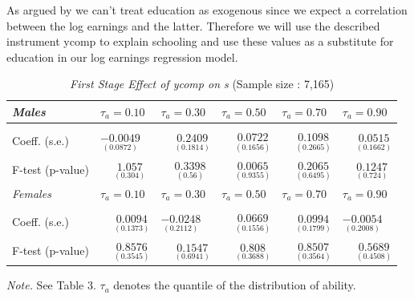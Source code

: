 \documentclass[12pt,a4paper]{article}
\begin{document}
As argued by \textcite{brunello} we can't treat education as exogenous
since we expect a correlation between the log earnings and the latter.
Therefore we will use the described instrument ycomp to explain
schooling and use these values as a substitute for education in our log
earnings regression model.


\begin{table}[!htbp]
\captionsetup{justification=centering}
  \begin{threeparttable}
       \caption{\textit{First Stage Effect of ycomp on s} (Sample size : 7,165)}
        \begin{tabular}{*{6}{l}}
        \toprule 
        \textit{Males}  & \( \tau_a=0.10 \) & \( \tau_a= 0.30 \) & \( \tau_a= 0.50 \) & \( \tau_a= 0.70 \) & \( \tau_a= 0.90 \) \\
        \midrule     \\
        Coeff. (s.e.)   & $\underset{(0.0872)}{-0.0049}$ & $\phantom{-}\underset{(0.1814)}{0.2409}$ & $\phantom{-}\underset{(0.1656)}{0.0722}$ & $\phantom{-}\underset{(0.2665)}{0.1098}$ & $\phantom{-}\underset{(0.1662)}{0.0515}$    \\
        F-test (p-value) & $\phantom{-}\underset{(0.304)}{1.057}$ & $\phantom{-}\underset{(0.56)}{0.3398}$ & $\phantom{-}\underset{(0.9355)}{0.0065}$ & $\phantom{-}\underset{(0.6495)}{0.2065}$ & $\phantom{-}\underset{(0.724)}{0.1247}$\\
        \midrule 
        \textit{Females}  & \( \tau_a=0.10 \) & \( \tau_a= 0.30 \) & \( \tau_a= 0.50 \) & \( \tau_a= 0.70 \) & \( \tau_a= 0.90 \) \\
        \midrule \\
        Coeff. (s.e.)    & $\phantom{-}\underset{(0.1373)}{0.0094}$ & $\underset{(0.2112)}{-0.0248}$ & $\phantom{-}\underset{(0.1556)}{0.0669}$ & $\phantom{-}\underset{(0.1799)}{0.0994}$ & $\underset{(0.2008)}{-0.0054}$  \\
        F-test (p-value) & $\phantom{-}\underset{(0.3545)}{0.8576}$ & $\phantom{-}\underset{(0.6941)}{0.1547}$ & $\phantom{-}\underset{(0.3688)}{0.808}$ & $\phantom{-}\underset{(0.3564)}{0.8507}$ & $\phantom{-}\underset{(0.4508)}{0.5689}$ \\
        \bottomrule
     \end{tabular}
    \begin{tablenotes}[flushleft]
      \small
      \item \textit{Note.} See Table 3. $\tau_a$ denotes the quantile of the distribution of ability.
    \end{tablenotes}
  \end{threeparttable}
\end{table}
\end{document}

